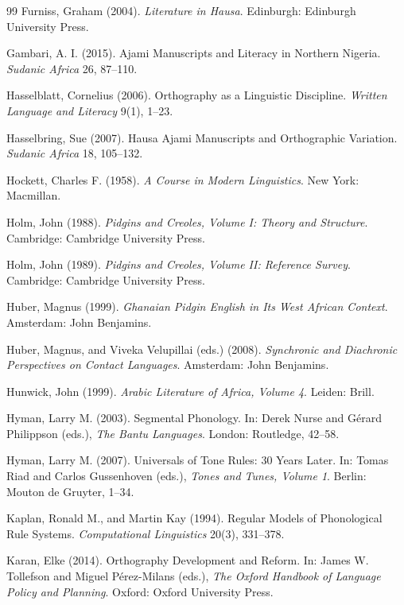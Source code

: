 \documentclass[12pt]{article}
\begin{document}
\begin{thebibliography}{99}
Furniss, Graham (2004).
\textit{Literature in Hausa}.
Edinburgh: Edinburgh University Press.

Gambari, A. I. (2015).
Ajami Manuscripts and Literacy in Northern Nigeria.
\textit{Sudanic Africa} 26, 87--110.

Hasselblatt, Cornelius (2006).
Orthography as a Linguistic Discipline.
\textit{Written Language and Literacy} 9(1), 1--23.

Hasselbring, Sue (2007).
Hausa Ajami Manuscripts and Orthographic Variation.
\textit{Sudanic Africa} 18, 105--132.

Hockett, Charles F. (1958).
\textit{A Course in Modern Linguistics}.
New York: Macmillan.

Holm, John (1988).
\textit{Pidgins and Creoles, Volume I: Theory and Structure}.
Cambridge: Cambridge University Press.

Holm, John (1989).
\textit{Pidgins and Creoles, Volume II: Reference Survey}.
Cambridge: Cambridge University Press.

Huber, Magnus (1999).
\textit{Ghanaian Pidgin English in Its West African Context}.
Amsterdam: John Benjamins.

Huber, Magnus, and Viveka Velupillai (eds.) (2008).
\textit{Synchronic and Diachronic Perspectives on Contact Languages}.
Amsterdam: John Benjamins.

Hunwick, John (1999).
\textit{Arabic Literature of Africa, Volume 4}.
Leiden: Brill.

Hyman, Larry M. (2003).
Segmental Phonology.
In: Derek Nurse and Gérard Philippson (eds.),
\textit{The Bantu Languages}.
London: Routledge, 42--58.

Hyman, Larry M. (2007).
Universals of Tone Rules: 30 Years Later.
In: Tomas Riad and Carlos Gussenhoven (eds.),
\textit{Tones and Tunes, Volume 1}.
Berlin: Mouton de Gruyter, 1--34.

Kaplan, Ronald M., and Martin Kay (1994).
Regular Models of Phonological Rule Systems.
\textit{Computational Linguistics} 20(3), 331--378.

Karan, Elke (2014).
Orthography Development and Reform.
In: James W. Tollefson and Miguel Pérez-Milans (eds.),
\textit{The Oxford Handbook of Language Policy and Planning}.
Oxford: Oxford University Press.


\end{thebibliography}
\end{document}
